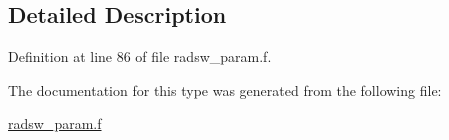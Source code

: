 \subsection{Detailed Description}


Definition at line 86 of file radsw\+\_\+param.\+f.



The documentation for this type was generated from the following file\+:\begin{DoxyCompactItemize}
\item 
\hyperlink{radsw__param_8f}{radsw\+\_\+param.\+f}\end{DoxyCompactItemize}
